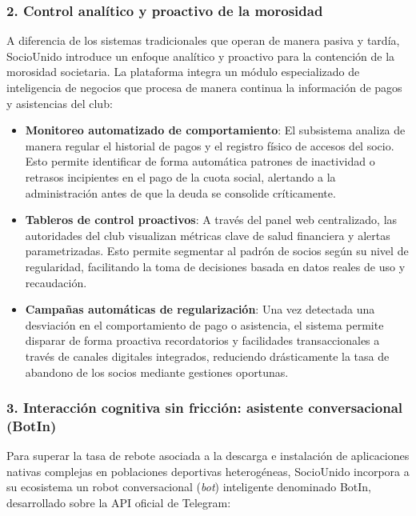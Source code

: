 \subsubsection{2. Control analítico y proactivo de la morosidad}
A diferencia de los sistemas tradicionales que operan de manera pasiva y tardía, SocioUnido introduce un enfoque analítico y proactivo para la contención de la morosidad societaria. La plataforma integra un módulo especializado de inteligencia de negocios que procesa de manera continua la información de pagos y asistencias del club:

\begin{itemize}
    \item \textbf{Monitoreo automatizado de comportamiento}: El subsistema analiza de manera regular el historial de pagos y el registro físico de accesos del socio. Esto permite identificar de forma automática patrones de inactividad o retrasos incipientes en el pago de la cuota social, alertando a la administración antes de que la deuda se consolide críticamente.
    \item \textbf{Tableros de control proactivos}: A través del panel web centralizado, las autoridades del club visualizan métricas clave de salud financiera y alertas parametrizadas. Esto permite segmentar al padrón de socios según su nivel de regularidad, facilitando la toma de decisiones basada en datos reales de uso y recaudación.
    \item \textbf{Campañas automáticas de regularización}: Una vez detectada una desviación en el comportamiento de pago o asistencia, el sistema permite disparar de forma proactiva recordatorios y facilidades transaccionales a través de canales digitales integrados, reduciendo drásticamente la tasa de abandono de los socios mediante gestiones oportunas.
\end{itemize}

\subsubsection{3. Interacción cognitiva sin fricción: asistente conversacional (BotIn)}
Para superar la tasa de rebote asociada a la descarga e instalación de aplicaciones nativas complejas en poblaciones deportivas heterogéneas, SocioUnido incorpora a su ecosistema un robot conversacional (\textit{bot}) inteligente denominado BotIn, desarrollado sobre la API oficial de Telegram:


